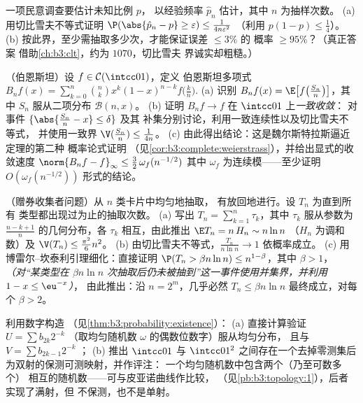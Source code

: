 \begin{exercise}[$\star\star$]\label{exo:b3:probability:7}
一项民意调查要估计未知比例 $p$，
以经验频率 $\hat p_n$ 估计，其中 $n$ 为抽样次数。
(a) 用切比雪夫不等式证明 $\P(\abs{\hat p_n - p} \geq \varepsilon)
\leq \frac1{4n\varepsilon^2}$ （利用 $p(1-p) \leq \frac14$）。
(b) 按此界，至少需抽取多少次，才能保证误差 $\leq 3\%$ 的
概率 $\geq 95\%$？（真正答案
借助\cref{ch:b3:clt}，约为 $1070$，切比雪夫
界诚实却粗糙。）
\end{exercise}

\begin{exercise}[$\star\star\star$]\label{exo:b3:probability:8}
（伯恩斯坦）设 $f \in \mathcal C(\intcc01)$，定义
伯恩斯坦多项式 $B_nf(x) =
\sum_{k=0}^n\binom nkx^k(1-x)^{n-k}f\bigl(\frac kn\bigr)$.
(a) 识别 $B_nf(x) = \E\bigl[f\bigl(\frac
{S_n}n\bigr)\bigr]$，其中 $S_n$ 服从二项分布 $\mathcal B(n, x)$。
(b) 证明 $B_nf \to f$ 在 $\intcc01$ 上\emph{一致收敛}：
对事件 $\{\abs{\frac{S_n}n - x} \leq \delta\}$ 及其
补集分别讨论，利用一致连续性以及切比雪夫不等式，
并使用一致界 $\V(\frac{S_n}n) \leq \frac1{4n}$。
(c) 由此得出结论：这是魏尔斯特拉斯逼近定理的第二种
概率论式证明
（见\cref{cor:b3:complete:weierstrass}），并给出显式的收敛速度
$\norm{B_nf - f}_\infty \leq \frac32\,\omega_f(n^{-1/2})$
其中 $\omega_f$ 为连续模——至少证明
$O(\omega_f(n^{-1/2}))$ 形式的结论。
\end{exercise}

\begin{exercise}[$\star\star\star$]\label{exo:b3:probability:9}
（赠券收集者问题）从 $n$ 类卡片中均匀地抽取，
有放回地进行。设 $T_n$ 为直到所有
类型都出现过为止的抽取次数。
(a) 写出 $T_n = \sum_{k=1}^{n}\tau_k$，其中 $\tau_k$
服从参数为 $\frac{n - k + 1}n$ 的几何分布，各 $\tau_k$
相互，由此推出 $\E T_n = n\,H_n \sim n\ln n$
（$H_n$ 为调和数）及 $\V(T_n) \leq
\frac{\pi^2}6n^2$。
(b) 由切比雪夫不等式，$\frac{T_n}{n\ln n} \to 1$ 依概率成立。
(c) 用博雷尔–坎泰利引理细化：直接证明 $\P(T_n >
\beta n\ln n) \leq n^{1 - \beta}$，其中 $\beta > 1$，
\emph{（对“某类型在
$\beta n\ln n$ 次抽取后仍未被抽到”这一事件使用并集界，并利用 $1 - x \leq \eu^{-x}$）}，
由此推出：沿 $n = 2^m$，几乎必然 $T_n \leq \beta n\ln
n$ 最终成立，对每个 $\beta > 2$。
\end{exercise}

\begin{exercise}[$\star\star$]\label{exo:b3:probability:10}
利用数字构造
（见\cref{thm:b3:probability:existence}）：
(a) 直接计算验证 $U = \sum b_{2k}2^{-k}$
（取均匀随机数 $\omega$ 的偶数位数字）服从均匀分布，
且与 $V = \sum b_{2k-1}2^{-k}$ ；
(b) 推出 $\intcc01$ 与
$\intcc01^2$ 之间存在一个去掉零测集后为双射的保测可测映射，并作评注：
一个均匀随机数中包含两个（乃至可数多个）
相互的随机数——可与皮亚诺曲线作比较，
（见\cref{pb:b3:topology:1}），后者实现了满射，但
不保测，也不是单射。
\end{exercise}

